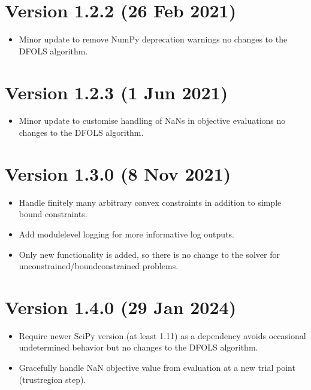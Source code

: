 \documentclass[letterpaper,10pt,english]{sphinxmanual}
\begin{document}
\section{Version 1.2.2 (26 Feb 2021)}
\label{\detokenize{history:version-1-2-2-26-feb-2021}}\begin{itemize}
\item {} 
\sphinxAtStartPar
Minor update to remove NumPy deprecation warnings \sphinxhyphen{} no changes to the DFO\sphinxhyphen{}LS algorithm.

\end{itemize}


\section{Version 1.2.3 (1 Jun 2021)}
\label{\detokenize{history:version-1-2-3-1-jun-2021}}\begin{itemize}
\item {} 
\sphinxAtStartPar
Minor update to customise handling of NaNs in objective evaluations \sphinxhyphen{} no changes to the DFO\sphinxhyphen{}LS algorithm.

\end{itemize}


\section{Version 1.3.0 (8 Nov 2021)}
\label{\detokenize{history:version-1-3-0-8-nov-2021}}\begin{itemize}
\item {} 
\sphinxAtStartPar
Handle finitely many arbitrary convex constraints in addition to simple bound constraints.

\item {} 
\sphinxAtStartPar
Add module\sphinxhyphen{}level logging for more informative log outputs.

\item {} 
\sphinxAtStartPar
Only new functionality is added, so there is no change to the solver for unconstrained/bound\sphinxhyphen{}constrained problems.

\end{itemize}


\section{Version 1.4.0 (29 Jan 2024)}
\label{\detokenize{history:version-1-4-0-29-jan-2024}}\begin{itemize}
\item {} 
\sphinxAtStartPar
Require newer SciPy version (at least 1.11) as a dependency \sphinxhyphen{} avoids occasional undetermined behavior but no changes to the DFO\sphinxhyphen{}LS algorithm.

\item {} 
\sphinxAtStartPar
Gracefully handle NaN objective value from evaluation at a new trial point (trust\sphinxhyphen{}region step).

\end{itemize}
\end{document}
